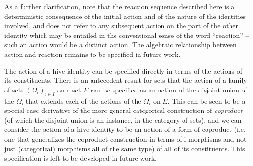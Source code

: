 \documentclass[pra,twocolumn,groupedaddress,10pt]{revtex4}
\theoremstyle{definition}
\begin{document}
As a further clarification, note that the reaction sequence described here is a deterministic consequence of the initial action and of the nature of the identities involved, and does not refer to any subsequent action on the part of the other identity which may be entailed in the conventional sense of the word ``reaction'' -- such an action would be a distinct action. The algebraic relationship between action and reaction remains to be specified in future work.

The action of a hive identity can be specified directly in terms of the actions of its constituents. There is an antecedent result for sets that the action of a family of sets $(\Omega_i)_{i \in I}$ on a set $E$ can be specified as an action of the disjoint union of the $\Omega_i$ that extends each of the actions of the $\Omega_i$ on $E$\cite{bourbaki}. This can be seen to be a special case derivative of the more general categorical construction of \emph{coproduct} (of which the disjoint union is an instance, in the category of sets), and we can consider the action of a hive identity to be an action of a form of coproduct (i.e. one that generalizes the coproduct construction in terms of i-morphisms and not just (categorical) morphisms all of the same type) of all of its constituents. This specification is left to be developed in future work.
\end{document}
